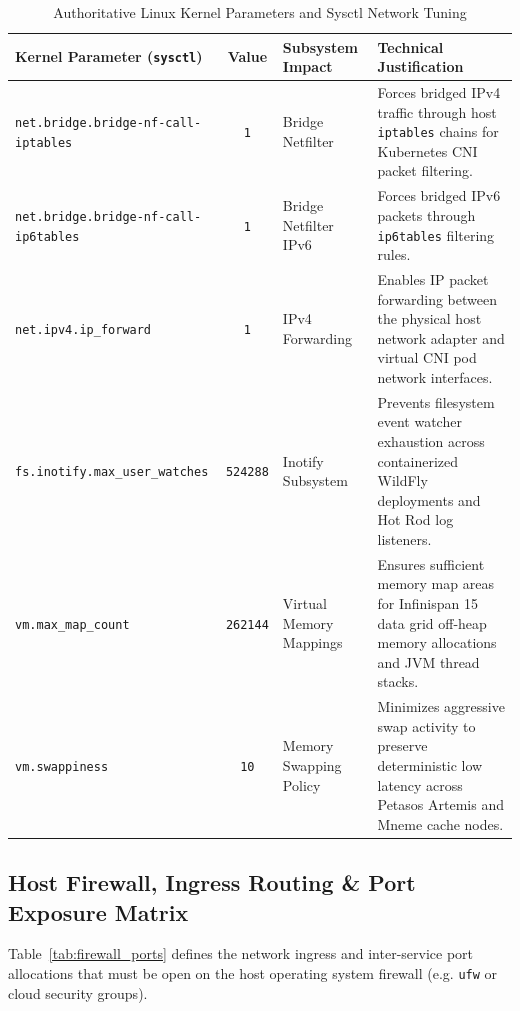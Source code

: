 \begin{table}[htbp]
\centering
\small
\begin{tabularx}{\textwidth}{l c p{4.2cm} X}
\toprule
\textbf{Kernel Parameter (\texttt{sysctl})} & \textbf{Value} & \textbf{Subsystem Impact} & \textbf{Technical Justification} \\
\midrule
\texttt{net.bridge.bridge-nf-call-iptables} & \texttt{1} & Bridge Netfilter & Forces bridged IPv4 traffic through host \texttt{iptables} chains for Kubernetes CNI packet filtering. \\
\addlinespace
\texttt{net.bridge.bridge-nf-call-ip6tables} & \texttt{1} & Bridge Netfilter IPv6 & Forces bridged IPv6 packets through \texttt{ip6tables} filtering rules. \\
\addlinespace
\texttt{net.ipv4.ip\_forward} & \texttt{1} & IPv4 Forwarding & Enables IP packet forwarding between the physical host network adapter and virtual CNI pod network interfaces. \\
\addlinespace
\texttt{fs.inotify.max\_user\_watches} & \texttt{524288} & Inotify Subsystem & Prevents filesystem event watcher exhaustion across containerized WildFly deployments and Hot Rod log listeners. \\
\addlinespace
\texttt{vm.max\_map\_count} & \texttt{262144} & Virtual Memory Mappings & Ensures sufficient memory map areas for Infinispan 15 data grid off-heap memory allocations and JVM thread stacks. \\
\addlinespace
\texttt{vm.swappiness} & \texttt{10} & Memory Swapping Policy & Minimizes aggressive swap activity to preserve deterministic low latency across Petasos Artemis and Mneme cache nodes. \\
\bottomrule
\end{tabularx}
\caption{Authoritative Linux Kernel Parameters and Sysctl Network Tuning}
\label{tab:sysctl_parameters}
\end{table}

\subsection{Host Firewall, Ingress Routing \& Port Exposure Matrix}

Table~\ref{tab:firewall_ports} defines the network ingress and inter-service port allocations that must be open on the host operating system firewall (e.g. \texttt{ufw} or cloud security groups).

